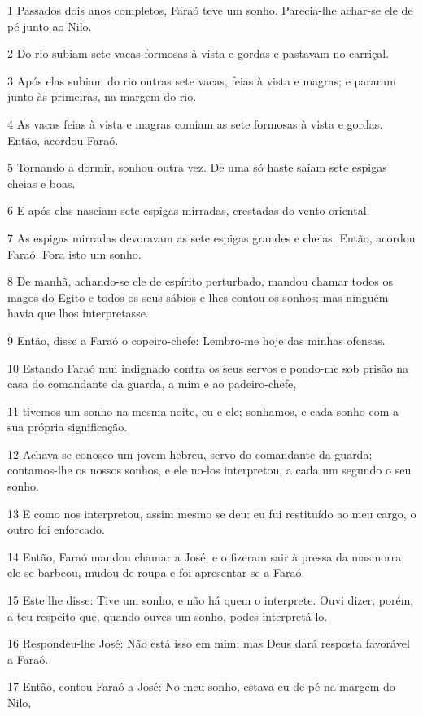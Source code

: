 \par 1 Passados dois anos completos, Faraó teve um sonho. Parecia-lhe achar-se ele de pé junto ao Nilo.
\par 2 Do rio subiam sete vacas formosas à vista e gordas e pastavam no carriçal.
\par 3 Após elas subiam do rio outras sete vacas, feias à vista e magras; e pararam junto às primeiras, na margem do rio.
\par 4 As vacas feias à vista e magras comiam as sete formosas à vista e gordas. Então, acordou Faraó.
\par 5 Tornando a dormir, sonhou outra vez. De uma só haste saíam sete espigas cheias e boas.
\par 6 E após elas nasciam sete espigas mirradas, crestadas do vento oriental.
\par 7 As espigas mirradas devoravam as sete espigas grandes e cheias. Então, acordou Faraó. Fora isto um sonho.
\par 8 De manhã, achando-se ele de espírito perturbado, mandou chamar todos os magos do Egito e todos os seus sábios e lhes contou os sonhos; mas ninguém havia que lhos interpretasse.
\par 9 Então, disse a Faraó o copeiro-chefe: Lembro-me hoje das minhas ofensas.
\par 10 Estando Faraó mui indignado contra os seus servos e pondo-me sob prisão na casa do comandante da guarda, a mim e ao padeiro-chefe,
\par 11 tivemos um sonho na mesma noite, eu e ele; sonhamos, e cada sonho com a sua própria significação.
\par 12 Achava-se conosco um jovem hebreu, servo do comandante da guarda; contamos-lhe os nossos sonhos, e ele no-los interpretou, a cada um segundo o seu sonho.
\par 13 E como nos interpretou, assim mesmo se deu: eu fui restituído ao meu cargo, o outro foi enforcado.
\par 14 Então, Faraó mandou chamar a José, e o fizeram sair à pressa da masmorra; ele se barbeou, mudou de roupa e foi apresentar-se a Faraó.
\par 15 Este lhe disse: Tive um sonho, e não há quem o interprete. Ouvi dizer, porém, a teu respeito que, quando ouves um sonho, podes interpretá-lo.
\par 16 Respondeu-lhe José: Não está isso em mim; mas Deus dará resposta favorável a Faraó.
\par 17 Então, contou Faraó a José: No meu sonho, estava eu de pé na margem do Nilo,
